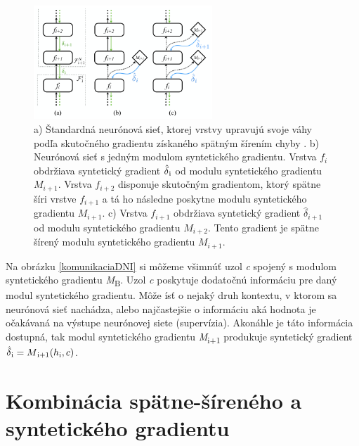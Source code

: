 \begin{figure}
\centerline{\includegraphics[width=0.6\textwidth]{images/multiDNI}}
\caption[Porovnanie architektúr neurónových sieti s implementáciou DNI]{a) Štandardná neurónová sieť, ktorej vrstvy upravujú svoje váhy podľa skutočného gradientu získaného spätným šírením chyby \cite{Goh1995}. b) Neurónová sieť s jedným modulom syntetického gradientu. Vrstva $f_i$ obdržiava syntetický gradient $\hat{\delta}\textsubscript{i}$ od modulu syntetického gradientu $M_{i+1}$. Vrstva $f_{i+2}$ disponuje skutočným gradientom, ktorý spätne šíri vrstve $f_{i+1}$ a tá ho následne poskytne modulu syntetického gradientu $M_{i+1}$. c) Vrstva $f_{i+1}$ obdržiava syntetický gradient $\hat{\delta}_{i+1}$ od modulu syntetického gradientu $M_{i+2}$. Tento gradient je spätne šírený modulu syntetického gradientu $M_{i+1}$. \cite{Jaderberg2016}}
\label{multiDNI}
\end{figure}

Na obrázku \ref{komunikaciaDNI} si môžeme všimnúť uzol \textit{c} spojený s modulom syntetického gradientu \textit{M}\textsubscript{B}. Uzol \textit{c} poskytuje dodatočnú informáciu pre daný modul syntetického gradientu. Môže ísť o nejaký druh kontextu, v ktorom sa neurónová sieť nachádza, alebo najčastejšie o informáciu aká hodnota je očakávaná na výstupe neurónovej siete (supervízia). Akonáhle je táto informácia dostupná, tak modul syntetického gradientu \textit{M}\textsubscript{i+1} produkuje syntetický gradient $\hat{\delta}\textsubscript{i} = M\textsubscript{i+1}(h\textsubscript{i},c)$.

\section{Kombinácia spätne-šíreného a syntetického gradientu}

